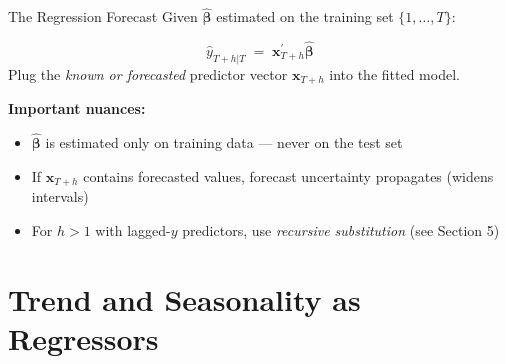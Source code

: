 \documentclass[aspectratio=169, 11pt]{beamer}
\begin{document}
\begin{frame}{The Regression Forecast}
  Given $\hat{\boldsymbol{\beta}}$ estimated on the training set $\{1, \ldots, T\}$:

  \begin{keybox}
    \[
      \hat{y}_{T+h|T} \;=\; \mathbf{x}_{T+h}^{\prime}\hat{\boldsymbol{\beta}}
    \]
    Plug the \emph{known or forecasted} predictor vector $\mathbf{x}_{T+h}$
    into the fitted model.
  \end{keybox}
  \vspace{0.2cm}
  \textbf{Important nuances:}
  \begin{itemize}
    \item $\hat{\boldsymbol{\beta}}$ is estimated only on training data
          --- never on the test set
    \item If $\mathbf{x}_{T+h}$ contains forecasted values, forecast
          uncertainty propagates (widens intervals)
    \item For $h > 1$ with lagged-$y$ predictors, use
          \emph{recursive substitution} (see Section 5)
  \end{itemize}
\end{frame}

\section{Trend and Seasonality as Regressors}

\end{document}
